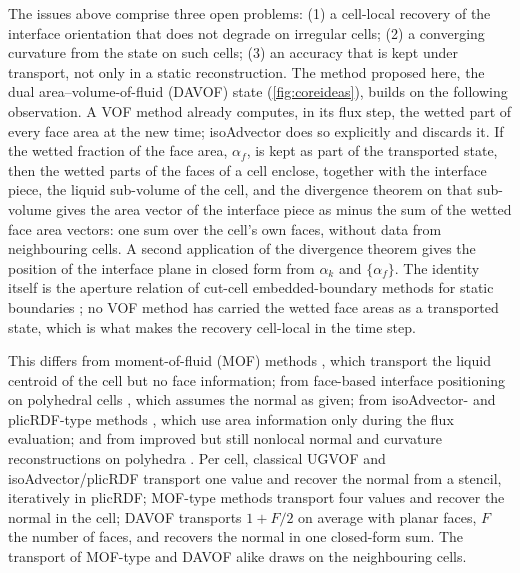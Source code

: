 \documentclass[preprint,12pt]{elsarticle}
\begin{document}
The issues above comprise three open problems: (1) a cell-local recovery of the interface orientation that does not degrade on irregular cells; (2) a converging curvature from the state on such cells; (3) an accuracy that is kept under transport, not only in a static reconstruction. The method proposed here, the dual area--volume-of-fluid (DAVOF) state (\cref{fig:coreideas}), builds on the following observation. A VOF method already computes, in its flux step, the wetted part of every face area at the new time; isoAdvector does so explicitly \citep{RoenbyEtAl2016} and discards it. If the wetted fraction of the face area, $\alpha_f$, is kept as part of the transported state, then the wetted parts of the faces of a cell enclose, together with the interface piece, the liquid sub-volume of the cell, and the divergence theorem on that sub-volume gives the area vector of the interface piece as minus the sum of the wetted face area vectors: one sum over the cell's own faces, without data from neighbouring cells. A second application of the divergence theorem gives the position of the interface plane in closed form from $\alpha_k$ and $\{\alpha_f\}$. The identity itself is the aperture relation of cut-cell embedded-boundary methods for static boundaries \citep{JohansenColella1998}; no VOF method has carried the wetted face areas as a transported state, which is what makes the recovery cell-local in the time step.

This differs from moment-of-fluid (MOF) methods \citep{Dyadechko2008,Jemison2013,SpainhourShashkov2025}, which transport the liquid centroid of the cell but no face information; from face-based interface positioning on polyhedral cells \citep{KromerBothe2022}, which assumes the normal as given; from isoAdvector- and plicRDF-type methods \citep{Dianat2017,RoenbyEtAl2016,ScheuflerRoenby2019,AsgharEtAl2025Wetting}, which use area information only during the flux evaluation; and from improved but still nonlocal normal and curvature reconstructions on polyhedra \citep{IveyMoin2015,KromerLeottaBothe2023}. Per cell, classical UGVOF and isoAdvector/plicRDF transport one value and recover the normal from a stencil, iteratively in plicRDF; MOF-type methods transport four values and recover the normal in the cell; DAVOF transports $1 + F/2$ on average with planar faces, $F$ the number of faces, and recovers the normal in one closed-form sum. The transport of MOF-type and DAVOF alike draws on the neighbouring cells.
\end{document}
